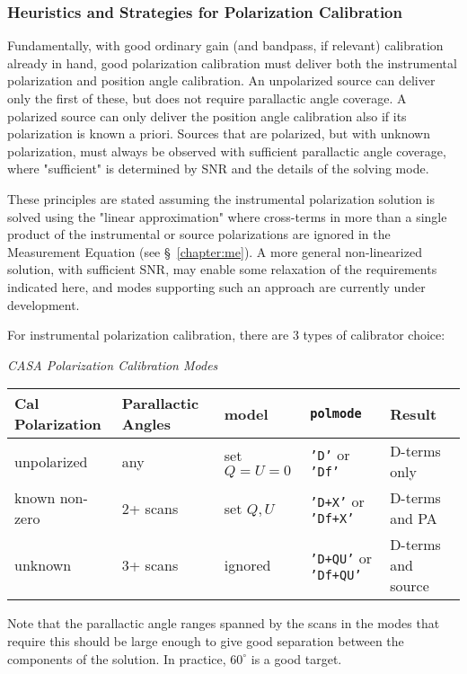 \subsubsection{Heuristics and Strategies for Polarization Calibration }
\label{section:cal.solve.pol.hstics}

Fundamentally, with good ordinary gain (and bandpass, if relevant)
calibration already in hand, good polarization calibration must
deliver both the instrumental polarization and position angle
calibration.  An unpolarized source can deliver only the first of
these, but does not require parallactic angle coverage.  A polarized
source can only deliver the position angle calibration also if its
polarization is known a priori.  Sources that are polarized, but with
unknown polarization, must always be observed with sufficient
parallactic angle coverage, where "sufficient" is determined by SNR
and the details of the solving mode.

These principles are stated assuming the instrumental polarization
solution is solved using the "linear approximation" where cross-terms
in more than a single product of the instrumental or source
polarizations are ignored in the Measurement Equation (see 
\S~\ref{chapter:me}).
A more general non-linearized solution, with sufficient SNR, may enable 
some relaxation of the requirements indicated here, and modes supporting
such an approach are currently under development.

For instrumental polarization calibration, there are 3 types of
calibrator choice:
\begin{center}
{\it CASA Polarization Calibration Modes}\\[5mm]
\begin{tabular}{|l|l|l|l|l|}
\hline
Cal Polarization & Parallactic Angles & model & 
    {\tt polmode} & Result \\
\hline
unpolarized & any & set $Q=U=0$ & {\tt 'D'} or {\tt 'Df'} & D-terms
  only \\
known non-zero & 2+ scans & set $Q,U$ & {\tt 'D+X'} or 
  {\tt 'Df+X'} & D-terms and PA \\
unknown & 3+ scans & ignored & {\tt 'D+QU'} or {\tt 'Df+QU'} &
  D-terms and source \\
\hline
\end{tabular}
\end{center}
Note that the parallactic angle ranges spanned by the scans in the
modes that require this should be large enough to give good separation
between the components of the solution.  In practice, $60^\circ$ is 
a good target.


